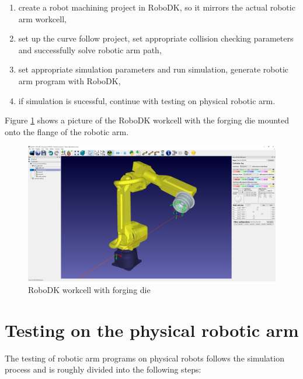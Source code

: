 \begin{enumerate}

\item create a robot machining project in RoboDK, so it mirrors the actual robotic arm workcell, 

\item set up the curve follow project, set appropriate collision checking parameters and successfully solve robotic arm path,

\item set appropriate simulation parameters and run simulation,
generate robotic arm program with RoboDK,

\item if simulation is sucessful, continue with testing on physical robotic arm.

\end{enumerate}

Figure \ref{fig:robodk_die} shows a picture of the RoboDK workcell with the forging die mounted onto the flange of the robotic arm.

\begin{figure}[h]
    \centering
    \includegraphics[width=0.9\linewidth]{img/robodk_cast.PNG}
    \caption{RoboDK workcell with forging die}
    \label{fig:robodk_die}
\end{figure}


\section{Testing on the physical robotic arm}

The testing of robotic arm programs on physical robots follows the simulation process and is roughly divided into the following steps:


